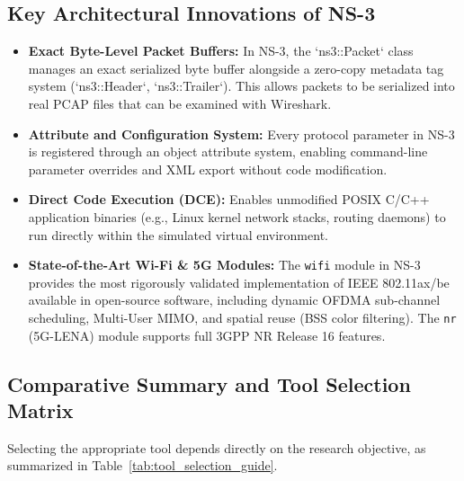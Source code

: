 \subsection{Key Architectural Innovations of NS-3}
\begin{itemize}
    \item \textbf{Exact Byte-Level Packet Buffers:} In NS-3, the `ns3::Packet` class manages an exact serialized byte buffer alongside a zero-copy metadata tag system (`ns3::Header`, `ns3::Trailer`). This allows packets to be serialized into real PCAP files that can be examined with Wireshark.
    \item \textbf{Attribute and Configuration System:} Every protocol parameter in NS-3 is registered through an object attribute system, enabling command-line parameter overrides and XML export without code modification.
    \item \textbf{Direct Code Execution (DCE):} Enables unmodified POSIX C/C++ application binaries (e.g., Linux kernel network stacks, routing daemons) to run directly within the simulated virtual environment.
    \item \textbf{State-of-the-Art Wi-Fi \& 5G Modules:} The \texttt{wifi} module in NS-3 provides the most rigorously validated implementation of IEEE 802.11ax/be available in open-source software, including dynamic OFDMA sub-channel scheduling, Multi-User MIMO, and spatial reuse (BSS color filtering). The \texttt{nr} (5G-LENA) module supports full 3GPP NR Release 16 features.
\end{itemize}

\subsection{Comparative Summary and Tool Selection Matrix}
Selecting the appropriate tool depends directly on the research objective, as summarized in Table~\ref{tab:tool_selection_guide}.


